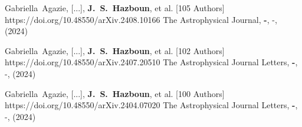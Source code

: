          {Gabriella~{Agazie}, [...], \textbf{J.~S.~{Hazboun}}, et al. [105 Authors]}
         {https://doi.org/10.48550/arXiv.2408.10166}
         {{The Astrophysical Journal}, \textbf{-}, -, (2024)}

         {Gabriella~{Agazie}, [...], \textbf{J.~S.~{Hazboun}}, et al. [102 Authors]}
         {https://doi.org/10.48550/arXiv.2407.20510}
         {{The Astrophysical Journal Letters}, \textbf{-}, -, (2024)}

         {Gabriella~{Agazie}, [...], \textbf{J.~S.~{Hazboun}}, et al. [100 Authors]}
         {https://doi.org/10.48550/arXiv.2404.07020}
         {{The Astrophysical Journal Letters}, \textbf{-}, -, (2024)}

